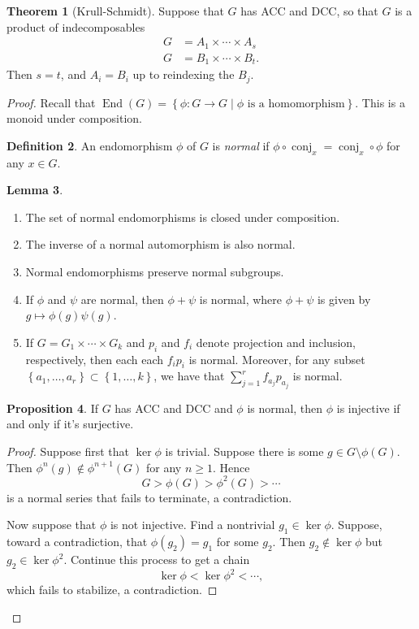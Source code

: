 \documentclass[10pt,letterpaper,cm]{nupset}
\theoremstyle{definition}
\newtheorem{definition}{Definition}[subsection]
\theoremstyle{theorem}
\newtheorem{theorem}[definition]{Theorem}
\newtheorem{lemma}[definition]{Lemma}
\newtheorem{prop}[definition]{Proposition}
\theoremstyle{remark}
\newcommand{\1}{\mathbf{1}}
\newcommand{\0}{\vec 0}
\newcommand{\dcc}{\textsf{DCC}\xspace}
\newcommand{\acc}{\textsf{ACC}\xspace}
\DeclareMathOperator{\ed}{End}
\DeclareMathOperator{\conj}{conj}
\begin{document}
\begin{theorem}[Krull-Schmidt]
Suppose that $G$ has \acc and \dcc, so that $G$ is a product of indecomposables \begin{align*}
G &  = A_1 \times \cdots \times A_s \\ G & = B_1 \times \cdots \times B_t.
\end{align*} Then $s=t$, and $A_i = B_i$ up to reindexing the $B_j$.
\end{theorem}
\begin{proof}
Recall that $\ed(G) = \left\{\phi : G \to G \mid \phi \text{ is a homomorphism}\right\}$. This is a monoid under composition.
\begin{definition}
An endomorphism $\phi$ of $G$ is \textit{normal} if $\phi \circ \conj_x = \conj_x \circ \phi$ for any $x\in G$.
\end{definition}
\begin{lemma} $ $
\begin{enumerate}
\item The set of normal endomorphisms is closed under composition.
\item The inverse of a normal automorphism is also normal.
\item Normal endomorphisms preserve normal subgroups.
\item If $\phi$ and $\psi$ are normal, then $\phi + \psi$ is normal, where $\phi + \psi$ is given by $g\mapsto \phi(g)\psi(g)$.
\item If $G = G_1 \times \cdots \times G_k$ and $p_i$ and $f_i$ denote projection and inclusion, respectively, then each each $f_ip_i$ is normal. Moreover, for any subset  $\left\{a_1, \ldots, a_r\right\} \subset \left\{1, \ldots, k\right\}$, we have that $\sum_{j=1}^r f_{a_j}p_{a_j}$ is normal.
\end{enumerate}
\end{lemma}
\begin{prop}
If $G$ has \acc and \dcc and $\phi$ is normal, then $\phi$ is injective if and only if it's surjective.
\end{prop}
\begin{proof}
Suppose first that $\ker{\phi}$ is trivial. Suppose there is some $g \in G \setminus \phi(G)$.  Then $\phi^n(g) \notin \phi^{n+1}(G)$ for any $n \geq 1$. Hence $$G > \phi(G) > \phi^2(G) > \cdots$$ is a normal series that fails to terminate, a contradiction. 

 Now suppose that $\phi$ is not injective. Find a nontrivial $g_1 \in \ker{\phi}$. Suppose, toward a contradiction, that $\phi(g_2) = g_1$ for some $g_2$. Then $g_2 \notin \ker{\phi}$ but $g_2 \in \ker{\phi^2}$. Continue this process to get a chain $$\ker{\phi} < \ker{\phi^2} < \cdots,$$ which fails to stabilize, a contradiction. 
\end{proof}


\end{proof}
\end{document}
